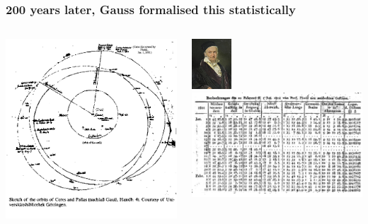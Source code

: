 \documentclass{beamer}
\newcommand{\pnote}[1] {}
\begin{document}
\pnote{Kepler had a more general hypothesis: that orbits could be
circular or elliptic. This led him to the broadly correct model
of all planets being in elliptical orbits around the
sun. However, the actual verification that all things do not revolve around earth, requires different experiments.
}
\begin{frame}
  \frametitle{200 years later, Gauss formalised this statistically}
  \begin{columns}
    \begin{column}{0.5\textwidth}
      \includegraphics[width=\columnwidth]{figures/gauss-diagram}
    \end{column}
    \begin{column}{0.5\textwidth}
      \includegraphics[width=4em]{figures/Gauss.jpg}
      \includegraphics[width=\columnwidth]{figures/SeptemberTable}
    \end{column}
  \end{columns}
\end{frame}
\end{document}
